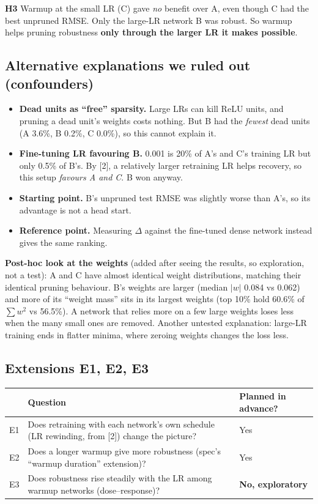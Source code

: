 \documentclass[11pt,a4paper]{article}
\newcommand{\verdict}[1]{\fbox{\footnotesize\textbf{#1}}}
\begin{document}
\textbf{H3} \verdict{Supported} Warmup at the small LR (C) gave \emph{no} benefit over A, even though C had the best
unpruned RMSE. Only the large-LR network B was robust. So warmup helps pruning robustness \textbf{only through the larger
LR it makes possible}.

\subsection{Alternative explanations we ruled out (confounders)}
\begin{itemize}
  \item \textbf{Dead units as ``free'' sparsity.} Large LRs can kill ReLU units, and pruning a dead unit's weights costs
        nothing. But B had the \emph{fewest} dead units (A 3.6\%, B 0.2\%, C 0.0\%), so this cannot explain it.
  \item \textbf{Fine-tuning LR favouring B.} 0.001 is 20\% of A's and C's training LR but only 0.5\% of B's. By [2], a
        relatively larger retraining LR helps recovery, so this setup \emph{favours A and C}. B won anyway.
  \item \textbf{Starting point.} B's unpruned test RMSE was slightly worse than A's, so its advantage is not a head start.
  \item \textbf{Reference point.} Measuring $\Delta$ against the fine-tuned dense network instead gives the same ranking.
\end{itemize}

\textbf{Post-hoc look at the weights} (added after seeing the results, so exploration, not a test): A and C have almost
identical weight distributions, matching their identical pruning behaviour. B's weights are larger (median $|w|$ 0.084
vs 0.062) and more of its ``weight mass'' sits in its largest weights (top 10\% hold 60.6\% of $\sum w^2$ vs 56.5\%). A
network that relies more on a few large weights loses less when the many small ones are removed. Another untested
explanation: large-LR training ends in flatter minima, where zeroing weights changes the loss less.

\subsection{Extensions E1, E2, E3}
\begin{tabularx}{\linewidth}{@{}lYl@{}}
\toprule
& Question & Planned in advance? \\
\midrule
E1 & Does retraining with each network's own schedule (LR rewinding, from [2]) change the picture? & Yes \\
E2 & Does a longer warmup give more robustness (spec's ``warmup duration'' extension)? & Yes \\
E3 & Does robustness rise steadily with the LR among warmup networks (dose--response)? & \textbf{No, exploratory} \\
\bottomrule
\end{tabularx}
\end{document}
